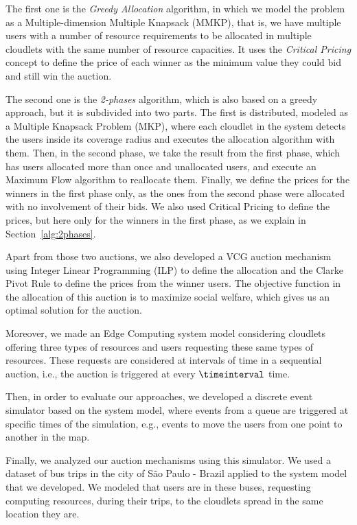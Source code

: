 \documentclass[English]{ic-tese-v3}
\begin{document}
The first one is the \emph{Greedy Allocation} algorithm, in which we model the problem as a Multiple-dimension Multiple Knapsack (MMKP), that is, we have multiple users with a number of resource requirements to be allocated in multiple cloudlets with the same number of resource capacities. It uses the \emph{Critical Pricing} concept to define the price of each winner as the minimum value they could bid and still win the auction.

The second one is the \emph{2-phases} algorithm, which is also based on a greedy approach, but it is subdivided into two parts. The first is distributed, modeled as a Multiple Knapsack Problem (MKP), where each cloudlet in the system detects the users inside its coverage radius and executes the allocation algorithm with them. Then, in the second phase, we take the result from the first phase, which has users allocated more than once and unallocated users, and execute an Maximum Flow algorithm to reallocate them. Finally, we define the prices for the winners in the first phase only, as the ones from the second phase were allocated with no involvement of their bids. We also used Critical Pricing to define the prices, but here only for the winners in the first phase, as we explain in Section~\ref{alg:2phases}.

Apart from those two auctions, we also developed a VCG auction mechanism using Integer Linear Programming (ILP) to define the allocation and the Clarke Pivot Rule to define the prices from the winner users. The objective function in the allocation of this auction is to maximize social welfare, which gives us an optimal solution for the auction.

Moreover, we made an Edge Computing system model considering cloudlets offering three types of resources and users requesting these same types of resources. These requests are considered at intervals of time in a sequential auction, i.e., the auction is triggered at every $\timeinterval$ time.

Then, in order to evaluate our approaches, we developed a discrete event simulator based on the system model, where events from a queue are triggered at specific times of the simulation, e.g., events to move the users from one point to another in the map.

Finally, we analyzed our auction mechanisms using this simulator. We used a dataset of bus trips in the city of São Paulo - Brazil applied to the system model that we developed. We modeled that users are in these buses, requesting computing resources, during their trips, to the cloudlets spread in the same location they are.
\end{document}
